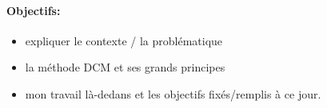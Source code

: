 


\paragraph{Objectifs:}


\begin{itemize}
\item expliquer le contexte / la problématique
\item la méthode DCM et ses grands principes
\item mon travail là-dedans et les objectifs fixés/remplis à ce jour.
\end{itemize}
